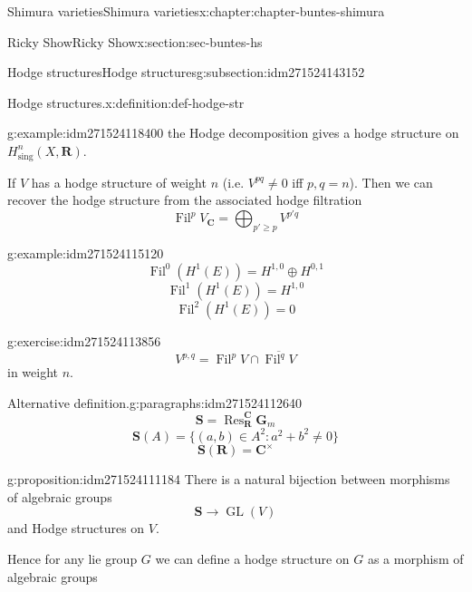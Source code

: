 \documentclass[oneside,10pt,]{book}
\numberwithin{equation}{section}
\newcommand{\RR}{\mathbf{R}}
\newcommand{\CC}{\mathbf{C}}
\DeclareMathOperator{\Fil}{Fil}
\DeclareMathOperator{\Res}{Res}
\DeclareMathOperator{\GL}{GL}
\begin{document}
\begin{chapterptx}{Shimura varieties}{}{Shimura varieties}{}{}{x:chapter:chapter-buntes-shimura}
\begin{sectionptx}{Ricky Show}{}{Ricky Show}{}{}{x:section:sec-buntes-hs}
\begin{subsectionptx}{Hodge structures}{}{Hodge structures}{}{}{g:subsection:idm271524143152}
\begin{definition}{Hodge structures.}{x:definition:def-hodge-str}
\end{definition}
\begin{example}{}{g:example:idm271524118400}%
the Hodge decomposition gives a hodge structure on \(H^n_{\mathrm{sing}}(X, \RR)\).%
\end{example}
If \(V\) has a hodge structure of weight \(n\) (i.e. \(V^{pq} \ne 0\) iff \(p,q = n\)). Then we can recover the hodge structure from the associated hodge filtration%
\begin{equation*}
\Fil^p V_\CC = \bigoplus_{p' \ge p} V^{p' q}
\end{equation*}
%
\begin{example}{}{g:example:idm271524115120}%
%
\begin{equation*}
\Fil^0(H^1(E)) = H^{1,0} \oplus H^{0,1}
\end{equation*}
%
\begin{equation*}
\Fil^1(H^1(E)) = H^{1,0}
\end{equation*}
%
\begin{equation*}
\Fil^2(H^1(E)) = 0
\end{equation*}
%
\end{example}
\begin{inlineexercise}{}{g:exercise:idm271524113856}%
%
\begin{equation*}
V^{p,q} = \Fil^p V \cap \overline {\Fil^q V}
\end{equation*}
in weight \(n\).%
\end{inlineexercise}
\begin{paragraphs}{Alternative definition.}{g:paragraphs:idm271524112640}%
%
\begin{equation*}
\mathbf S = \Res_\RR^\CC \mathbf G_m
\end{equation*}
%
\begin{equation*}
\mathbf S(A) = \{ (a,b) \in A^2 : a^2+  b^2 \ne 0\}
\end{equation*}
%
\begin{equation*}
\mathbf S(\RR) = \CC^\times
\end{equation*}
%
\begin{proposition}{}{}{g:proposition:idm271524111184}%
There is  a natural bijection between morphisms of algebraic groups%
\begin{equation*}
\mathbf S \to \GL(V)
\end{equation*}
and Hodge structures on \(V\).%
\end{proposition}
Hence for any lie group \(G\) we can define a hodge structure on \(G\) as a morphism of algebraic groups%
\begin{equation*}

\end{equation*}
\end{paragraphs}
\end{subsectionptx}
\end{sectionptx}
\end{chapterptx}
\end{document}
